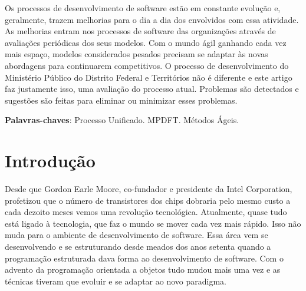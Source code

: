 \documentclass[
	article,			%
	11pt,				%
	oneside,			%
	a4paper,			%
	english,			%
	brazil,				%
	sumario=tradicional
	]{abntex2}
\begin{document}
%
%
\maketitle

\begin{resumoumacoluna}

   Os processos de desenvolvimento de software estão em constante evolução e,
   geralmente, trazem melhorias para o dia a dia dos envolvidos com essa
   atividade. As melhorias entram nos processos de software das organizações
   através de avaliações periódicas dos seus modelos. Com o mundo ágil ganhando
   cada vez mais espaço, modelos considerados pesados precisam se adaptar às
   novas abordagens para continuarem competitivos. O processo de desenvolvimento
   do Ministério Público do Distrito Federal e Territórios não é diferente e
   este artigo faz justamente isso, uma avaliação do processo atual. Problemas
   são detectados e sugestões são feitas para eliminar ou minimizar esses
   problemas.

   \vspace{\onelineskip}

   \noindent
   \textbf{Palavras-chaves}: Processo Unificado. MPDFT. Métodos Ágeis.
\end{resumoumacoluna}


\textual

\section*{Introdução}

Desde que Gordon Earle Moore, co-fundador e presidente da Intel Corporation,
profetizou que o número de transistores dos chips dobraria pelo mesmo custo a
cada dezoito meses vemos uma revolução tecnológica. Atualmente, quase tudo está
ligado à tecnologia, que faz o mundo se mover cada vez mais rápido. Isso não
muda para o ambiente de desenvolvimento de software. Essa área vem se
desenvolvendo e se estruturando desde meados dos anos setenta quando a
programação estruturada dava forma ao desenvolvimento de software. Com o advento
da programação orientada a objetos tudo mudou mais uma vez e as técnicas tiveram
que evoluir e se adaptar ao novo paradigma.
\end{document}
